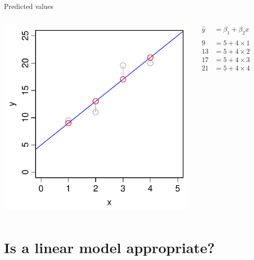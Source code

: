 \documentclass[xcolor=x11names,compress]{beamer}
\renewcommand{\(}{\begin{columns}}
\renewcommand{\)}{\end{columns}}
\newcommand{\<}[1]{\begin{column}{#1}}
\renewcommand{\>}{\end{column}}
\begin{document}
\begin{frame}{Predicted values}

\begin{columns}[T]

		\includegraphics[width=\textwidth]{Predicted.pdf}
		
		\begin{align*}
		  \hat{y}  &= \beta_1 + \beta_2 x  \\
		  \\
		  9  &= 5 + 4 \times 1 \\
		  13 &= 5 + 4 \times 2 \\
		  17 &= 5 + 4 \times 3 \\
		  21 &= 5 + 4 \times 4  
		\end{align*}
\end{columns}		
\end{frame}



\section{Is a linear model appropriate?}

\end{document}
